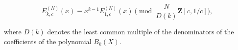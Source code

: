 $$E_{k,c}^{(N)}(x) \equiv x^{k-1} E_{1,c}^{(N)}(x) \pmod{\frac{N}{D(k)}\mathbf{Z}[c, 1/c]},$$

where $D(k)$ denotes the least common multiple of the denominators of the coefficients of the polynomial $B_k(X)$.
